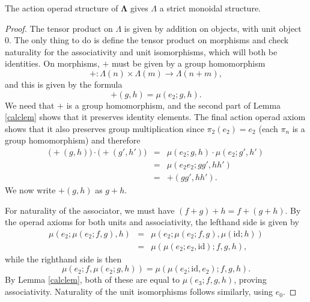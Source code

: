 \documentclass{amsbook} %
\newcommand{\ML}{\mathbf{\Lambda}}
\numberwithin{section}{chapter}
\begin{document}
\begin{prop}\label{Gmonoidal}
The action operad structure of $\ML$ gives $\mathbb{\Lambda}$ a strict monoidal structure.
\end{prop}
\begin{proof}
The tensor product on $\mathbb{\Lambda}$ is given by addition on objects, with unit object 0.  The only thing to do is define the tensor product on morphisms and check naturality for the associativity and unit isomorphisms, which will both be identities.  On morphisms, $+$ must be given by a group homomorphism
\[
+:\Lambda(n) \times \Lambda(m) \rightarrow \Lambda(n+m),
\]
 and this is given by the formula
\[
+(g,h) = \mu(e_{2}; g,h).
\]
We need that $+$ is a group homomorphism, and the second part of Lemma \ref{calclem} shows that it preserves identity elements.  The final action operad axiom shows that it also preserves group multiplication since $\pi_{2}(e_{2}) = e_{2}$ (each $\pi_{n}$ is a group homomorphism) and therefore
\[
\begin{array}{rcl}
\Big(+(g,h)\Big) \cdot \Big(+(g',h')\Big) & = & \mu(e_{2}; g,h) \cdot \mu(e_{2}; g',h') \\
 & = & \mu(e_{2}e_{2}; gg', hh') \\
& = & +(gg',hh').
\end{array}
\]
We now write $+(g,h)$ as $g+h$.

For naturality of the associator, we must have $(f+g)+h = f+(g+h)$.  By the operad axioms for both units and associativity, the lefthand side is given by
\[
\begin{array}{rcl}
\mu(e_{2}; \mu(e_{2}; f,g), h) & = & \mu(e_{2}; \mu(e_{2}; f,g), \mu(\textrm{id};h)) \\
& = & \mu(\mu(e_{2}; e_{2}, \textrm{id}); f,g,h),
\end{array}
\]
while the righthand side is then
\[
\mu(e_{2}; f, \mu(e_{2}; g,h)) = \mu(\mu(e_{2}; \textrm{id}, e_{2}); f,g,h).
\]
By Lemma \ref{calclem}, both of these are equal to $\mu(e_{3}; f,g,h)$, proving associativity.  Naturality of the unit isomorphisms follows similarly, using $e_{0}$.
\end{proof}
\end{document}
